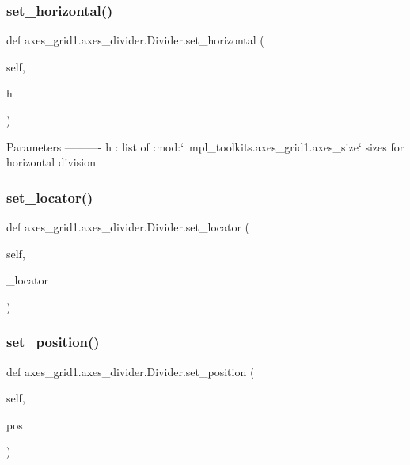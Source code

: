 \subsubsection{\texorpdfstring{set\+\_\+horizontal()}{set\_horizontal()}}
{\footnotesize\ttfamily def axes\+\_\+grid1.\+axes\+\_\+divider.\+Divider.\+set\+\_\+horizontal (\begin{DoxyParamCaption}\item[{}]{self,  }\item[{}]{h }\end{DoxyParamCaption})}

\begin{DoxyVerb}Parameters
----------
h : list of :mod:`~mpl_toolkits.axes_grid1.axes_size`
    sizes for horizontal division
\end{DoxyVerb}
 \mbox{\label{classaxes__grid1_1_1axes__divider_1_1Divider_aeeaf704f7b96c654757dd339941ad43e}} 
\subsubsection{\texorpdfstring{set\+\_\+locator()}{set\_locator()}}
{\footnotesize\ttfamily def axes\+\_\+grid1.\+axes\+\_\+divider.\+Divider.\+set\+\_\+locator (\begin{DoxyParamCaption}\item[{}]{self,  }\item[{}]{\+\_\+locator }\end{DoxyParamCaption})}

\mbox{\label{classaxes__grid1_1_1axes__divider_1_1Divider_a3a7fbea2dccb379c8d4b32cfebc25dab}} 
\subsubsection{\texorpdfstring{set\+\_\+position()}{set\_position()}}
{\footnotesize\ttfamily def axes\+\_\+grid1.\+axes\+\_\+divider.\+Divider.\+set\+\_\+position (\begin{DoxyParamCaption}\item[{}]{self,  }\item[{}]{pos }\end{DoxyParamCaption})}

